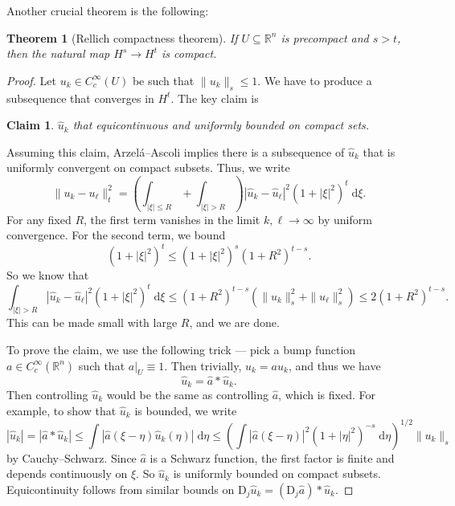 \documentclass{shortart}
\newtheorem*{thm}{Theorem}
\newtheorem*{claim}{Claim}
\theoremstyle{definition}
\newcommand\R{\mathbb{R}}
\newcommand\der{\mathrm{d}}
\newcommand\D{\mathrm{D}}
\begin{document}
Another crucial theorem is the following:
\begin{thm}[Rellich compactness theorem]
  If $U \subseteq \R^n$ is precompact and $s > t$, then the natural map $H^s \to H^t$ is compact.
\end{thm}
\begin{proof}
  Let $u_k \in C^\infty_c(U)$ be such that $\|u_k\|_s \leq 1$. We have to produce a subsequence that converges in $H^t$. The key claim is
  \begin{claim}
    $\hat{u}_k$ that equicontinuous and uniformly bounded on compact sets.
  \end{claim}
  Assuming this claim, Arzel\'a--Ascoli implies there is a subsequence of $\hat{u}_k$ that is uniformly convergent on compact subsets. Thus, we write
  \[
    \|u_k - u_\ell\|_t^2 = \left(\int_{|\xi|\leq R} + \int_{|\xi| > R}\right)|\hat{u}_k - \hat{u}_\ell|^2 (1 + |\xi|^2)^t \;\der \xi.
  \]
  For any fixed $R$, the first term vanishes in the limit $k, \ell \to \infty$ by uniform convergence. For the second term, we bound
  \[
    (1 + |\xi|^2)^t \leq (1 + |\xi|^2)^s (1 + R^2)^{t - s}.
  \]
  So we know that
  \[
    \int_{|\xi| > R}|\hat{u}_k - \hat{u}_\ell|^2 (1 + |\xi|^2)^t \;\der \xi \leq (1 + R^2)^{t - s}(\|u_k\|_s^2 + \|u_\ell\|_s^2) \leq 2 (1 + R^2)^{t - s}.
  \]
  This can be made small with large $R$, and we are done.

  To prove the claim, we use the following trick --- pick a bump function $a \in C_c^\infty(\R^n)$ such that $a|_U \equiv 1$. Then trivially, $u_k = au_k$, and thus we have
  \[
    \hat{u}_k = \hat{a} * \hat{u}_k.
  \]
  Then controlling $\hat{u}_k$ would be the same as controlling $\hat{a}$, which is fixed. For example, to show that $\hat{u}_k$ is bounded, we write
  \[
    |\hat{u}_k| = |\hat{a} * \hat{u}_k| \leq \int |\hat{a}(\xi - \eta) \hat{u}_k(\eta)|\;\der \eta \leq \left(\int |\hat{a} (\xi - \eta)|^2 (1 + |\eta|^2)^{-s}\;\der \eta\right)^{1/2} \|u_k\|_s
  \]
  by Cauchy--Schwarz. Since $\hat{a}$ is a Schwarz function, the first factor is finite and depends continuously on $\xi$. So $\hat{u}_k$ is uniformly bounded on compact subsets. Equicontinuity follows from similar bounds on $\D_j \hat{u}_k = (\D_j \hat{a}) * \hat{u}_k$.
\end{proof}
\end{document}
